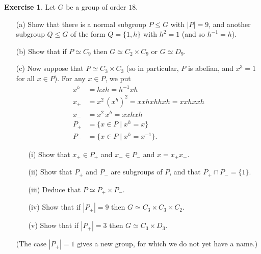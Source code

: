 \documentclass{amsart}
\renewcommand{\:}{\colon}
\newcommand{\tm}{\times}
\newcommand{\st}{\;|\;}
\theoremstyle{definition}
\newtheorem{exercise}{Exercise}
\begin{document}
\begin{exercise}
 Let $G$ be a group of order $18$.
 \begin{itemize}
 \item[(a)] Show that there is a normal subgroup $P\leq G$ with
  $|P|=9$, and another subgroup $Q\leq G$ of the form $Q=\{1,h\}$ with
  $h^2=1$ (and so $h^{-1}=h$).
 \item[(b)] Show that if $P\simeq C_9$ then $G\simeq C_2\tm C_9$ or
  $G\simeq D_9$.
 \item[(c)] Now suppose that $P\simeq C_3\tm C_3$ (so in particular,
  $P$ is abelian, and $x^3=1$ for all $x\in P$).  For any $x\in P$, we
  put  
  \begin{align*}
   x^h &= hxh = h^{-1}xh \\
   x_+ &= x^2\,(x^h)^2 = xxhxhhxh = xxhxxh \\ 
   x_- &= x^2\,x^h = xxhxh \\
   P_+ &= \{x\in P \st x^h=x\} \\
   P_- &= \{x\in P \st x^h=x^{-1}\}.
  \end{align*}
  \begin{itemize}
   \item[(i)] Show that $x_+\in P_+$ and $x_-\in P_-$ and $x=x_+x_-$.
   \item[(ii)] Show that $P_+$ and $P_-$ are subgroups of $P$, and that
    $P_+\cap P_-=\{1\}$.
   \item[(iii)] Deduce that $P\simeq P_+\tm P_-$.
   \item[(iv)] Show that if $|P_+|=9$ then $G\simeq C_3\tm C_3\tm C_2$.
   \item[(v)] Show that if $|P_+|=3$ then $G\simeq C_3\tm D_3$.
  \end{itemize}
  (The case $|P_+|=1$ gives a new group, for which we do not yet have
  a name.)
 \end{itemize}
\end{exercise}
\end{document}
